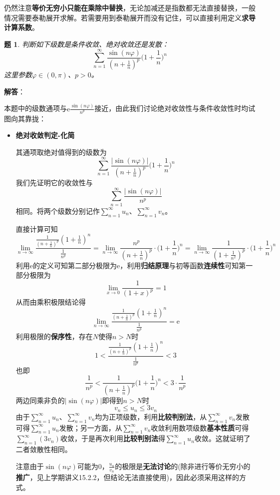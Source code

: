\documentclass[a4paper,UTF8,fontset=windows,AutoFakeBold]{ctexart}
\newcommand*{\er}{\mathrm{e}}
\newcommand*{\suminf}[1][n=1]{\sum_{#1}^\infty}
\newcommand*{\note}{\noindent *}
\theoremstyle{ex}
\newtheorem{exercise}{题}
\newcommand{\sol}[1]{{\vspace{5pt}\kaishu\noindent\textbf{解答}：\vspace{-3pt}
\begin{compactitem}
    \item[] #1
\end{compactitem}
}}
\begin{document}
\note 仍然注意\textbf{等价无穷小只能在乘除中替换}，无论加减还是指数都无法直接替换，一般情况需要泰勒展开求解。若需要用到泰勒展开而没有记住，可以直接利用定义\textbf{求导计算系数}。

\begin{framed}
\begin{exercise}
    判断如下级数是条件收敛、绝对收敛还是发散：
    $$\suminf\frac{\sin(n\varphi)}{(n+\frac{1}{n})^p}\bigg(1+\frac{1}{n}\bigg)^n$$
    这里参数$\varphi\in(0,\pi)$、$p>0$。
\end{exercise}
\sol{
    本题中的级数通项与$\er\frac{\sin(n\varphi)}{n^p}$接近，由此我们讨论绝对收敛性与条件收敛性时均试图向其靠拢：
    \begin{itemize}
        \item \textbf{绝对收敛判定-化简}
        
        其通项取绝对值得到的级数为
        $$\suminf\frac{|\sin(n\varphi)|}{(n+\frac{1}{n})^p}\bigg(1+\frac{1}{n}\bigg)^n$$
        我们先证明它的收敛性与
        $$\suminf\frac{|\sin(n\varphi)|}{n^p}$$
        相同。将两个级数分别记作$\suminf u_n$、$\suminf v_n$。

        直接计算可知
        $$\lim_{n\to\infty}\frac{\frac{1}{(n+\frac{1}{n})^p}(1+\frac{1}{n})^n}{\frac{1}{n^p}}=\lim_{n\to\infty}\frac{n^p}{(n+\frac{1}{n})^p}\cdot\bigg(1+\frac{1}{n}\bigg)^n=\lim_{n\to\infty}\frac{1}{(1+\frac{1}{n^2})^p}\cdot\bigg(1+\frac{1}{n}\bigg)^n$$
        利用$\er$的定义可知第二部分极限为$\er$，利用\textbf{归结原理}与初等函数\textbf{连续性}可知第一部分极限为
        $$\lim_{x\to0}\frac{1}{(1+x)^p}=1$$
        从而由乘积极限结论得
        $$\lim_{n\to\infty}\frac{\frac{1}{(n+\frac{1}{n})^p}(1+\frac{1}{n})^n}{\frac{1}{n^p}}=\er$$
        利用极限的\textbf{保序性}，存在$N$使得$n>N$时
        $$1<\frac{\frac{1}{(n+\frac{1}{n})^p}(1+\frac{1}{n})^n}{\frac{1}{n^p}}<3$$
        也即
        $$\frac{1}{n^p}<\frac{1}{(n+\frac{1}{n})^p}\bigg(1+\frac{1}{n}\bigg)^n<3\cdot\frac{1}{n^p}$$
        两边同乘非负的$|\sin(n\varphi)|$即得到$n>N$时
        $$v_n\le u_n\le 3v_n$$
        由于$\suminf u_n$、$\suminf v_n$均为正项级数，利用\textbf{比较判别法}，从$\suminf v_n$发散可得$\suminf u_n$发散；另一方面，从$\suminf v_n$收敛利用数项级数\textbf{基本性质}可得$\suminf(3v_n)$收敛，于是再次利用\textbf{比较判别法}得$\suminf u_n$收敛。这就证明了二者敛散性相同。

        \note 注意由于$\sin(n\varphi)$可能为0，$\frac{u_n}{v_n}$的极限是\textbf{无法讨论}的(除非进行等价无穷小的\textbf{推广}，见上学期讲义15.2.2，但结论无法直接使用)，因此必须采用这样的方式。


\end{itemize}}
\end{framed}
\end{document}
